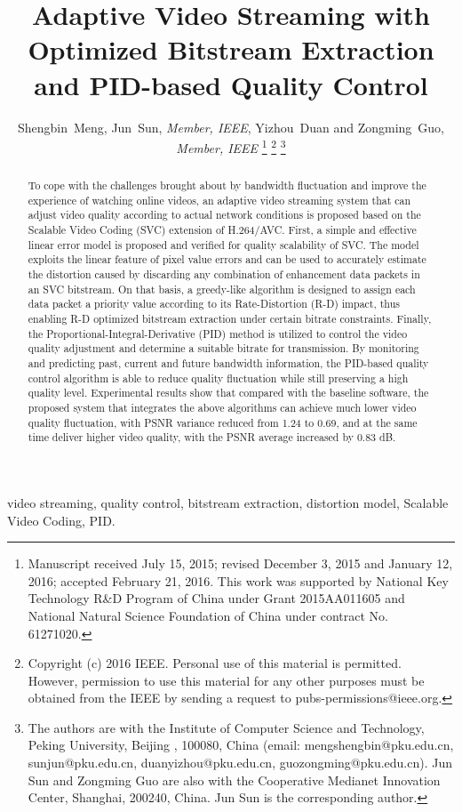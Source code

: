 \documentclass[journal]{IEEEtran}
\title{Adaptive Video Streaming with Optimized Bitstream Extraction and PID-based Quality Control}
\author{Shengbin~Meng, Jun~Sun, {\em Member, IEEE}, Yizhou~Duan and Zongming~Guo, {\em Member, IEEE} %
\thanks{Manuscript received July 15, 2015; revised December 3, 2015 and January 12, 2016; accepted February 21, 2016. This work was supported by  National Key Technology R\&D Program of China under Grant 2015AA011605 and National Natural Science Foundation of China under contract No. 61271020.}
\thanks{Copyright (c) 2016 IEEE. Personal use of this material is permitted. However, permission to use this material for any other purposes must be obtained from the IEEE by sending a request to pubs-permissions@ieee.org.}
\thanks{The authors are with the Institute of Computer Science and Technology, Peking University, Beijing%
, 100080, China (email: mengshengbin@pku.edu.cn, sunjun@pku.edu.cn, duanyizhou@pku.edu.cn, guozongming@pku.edu.cn). Jun Sun and Zongming Guo are also with the Cooperative Medianet Innovation Center, Shanghai, 200240, China. Jun Sun is the corresponding author.}
}
\begin{document}



\maketitle

\begin{abstract}
To cope with the challenges brought about by bandwidth fluctuation and improve the experience of watching online videos, an adaptive video streaming system that can adjust video quality according to actual network conditions is proposed based on the Scalable Video Coding (SVC) extension of H.264/AVC. First, a simple and effective linear error model is proposed and verified for quality scalability of SVC. The model exploits the linear feature of pixel value errors and can be used to accurately estimate the distortion caused by discarding any combination of enhancement data packets in an SVC bitstream. On that basis, a greedy-like algorithm is designed to assign each data packet a priority value according to its Rate-Distortion (R-D) impact, thus enabling R-D optimized bitstream extraction under certain bitrate constraints. Finally, the Proportional-Integral-Derivative (PID) method is utilized to control the video quality adjustment and determine a suitable bitrate for transmission. By monitoring and predicting past, current and future bandwidth information, the PID-based quality control algorithm is able to reduce quality fluctuation while still preserving a high quality level. Experimental results show that compared with the baseline software, the proposed system that integrates the above algorithms can achieve much lower video quality fluctuation, with PSNR variance reduced from 1.24 to 0.69, and at the same time deliver higher video quality, with the PSNR average increased by 0.83 dB.
\end{abstract}

\begin{IEEEkeywords}
video streaming, quality control, bitstream extraction, distortion model, Scalable Video Coding, PID.
\end{IEEEkeywords}



%
\IEEEpeerreviewmaketitle
\end{document}
